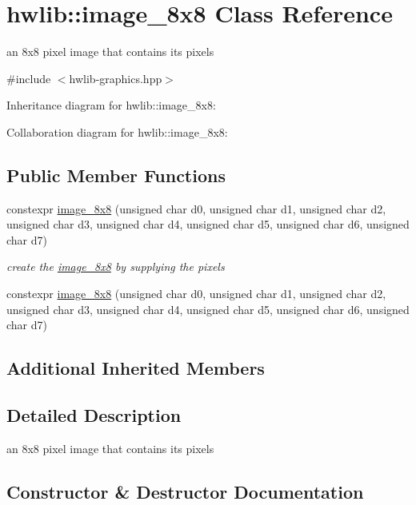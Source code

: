 \hypertarget{classhwlib_1_1image__8x8}{}\section{hwlib\+:\+:image\+\_\+8x8 Class Reference}
\label{classhwlib_1_1image__8x8}


an 8x8 pixel image that contains its pixels  




{\ttfamily \#include $<$hwlib-\/graphics.\+hpp$>$}



Inheritance diagram for hwlib\+:\+:image\+\_\+8x8\+:


Collaboration diagram for hwlib\+:\+:image\+\_\+8x8\+:
\subsection*{Public Member Functions}
\begin{DoxyCompactItemize}
\item 
constexpr \hyperlink{classhwlib_1_1image__8x8_a9384d60dbb742e96c3c03792545fbd56}{image\+\_\+8x8} (unsigned char d0, unsigned char d1, unsigned char d2, unsigned char d3, unsigned char d4, unsigned char d5, unsigned char d6, unsigned char d7)
\begin{DoxyCompactList}\small\item\em create the \hyperlink{classhwlib_1_1image__8x8}{image\+\_\+8x8} by supplying the pixels \end{DoxyCompactList}\item 
constexpr \hyperlink{classhwlib_1_1image__8x8_a9384d60dbb742e96c3c03792545fbd56}{image\+\_\+8x8} (unsigned char d0, unsigned char d1, unsigned char d2, unsigned char d3, unsigned char d4, unsigned char d5, unsigned char d6, unsigned char d7)
\end{DoxyCompactItemize}
\subsection*{Additional Inherited Members}


\subsection{Detailed Description}
an 8x8 pixel image that contains its pixels 

\subsection{Constructor \& Destructor Documentation}
\mbox{\label{classhwlib_1_1image__8x8_a9384d60dbb742e96c3c03792545fbd56}} 
